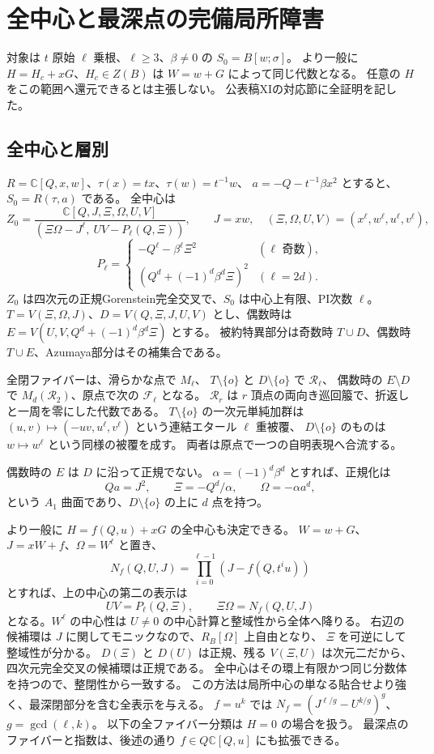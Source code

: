 \section{全中心と最深点の完備局所障害}
\label{sec:notes-global-center-v40}

対象は $t$ 原始 $\ell$ 乗根、$\ell\ge3$、$\beta\ne0$ の $S_0=B[w;\sigma]$。
より一般に $H=H_c+xG$、$H_c\in Z(B)$ は $W=w+G$ によって同じ代数となる。
任意の $H$ をこの範囲へ還元できるとは主張しない。
公表稿XIの対応節に全証明を記した。

\subsection{全中心と層別}

$R=\mathbb C[Q,x,w]$、$\tau(x)=tx$、$\tau(w)=t^{-1}w$、
$a=-Q-t^{-1}\beta x^2$ とすると、$S_0=R(\tau,a)$ である。
全中心は
\[
 Z_0=\frac{\mathbb C[Q,J,\Xi,\Omega,U,V]}
 {(\Xi\Omega-J^\ell,\ UV-P_\ell(Q,\Xi))},
 \qquad J=xw,\quad(\Xi,\Omega,U,V)=(x^\ell,w^\ell,u^\ell,v^\ell),
\]
\[
 P_\ell=
 \begin{cases}
 -Q^\ell-\beta^\ell\Xi^2& (\ell\text{ 奇数}),\\
 (Q^d+(-1)^d\beta^d\Xi)^2& (\ell=2d).
 \end{cases}
\]
$Z_0$ は四次元の正規Gorenstein完全交叉で、$S_0$ は中心上有限、PI次数 $\ell$。
$T=V(\Xi,\Omega,J)$、$D=V(Q,\Xi,J,U,V)$ とし、偶数時は
$E=V(U,V,Q^d+(-1)^d\beta^d\Xi)$ とする。
被約特異部分は奇数時 $T\cup D$、偶数時 $T\cup E$、Azumaya部分はその補集合である。

全閉ファイバーは、滑らかな点で $M_\ell$、
$T\setminus\{o\}$ と $D\setminus\{o\}$ で $\mathcal R_\ell$、
偶数時の $E\setminus D$ で $M_d(\mathcal R_2)$、原点で次の $\mathcal F_\ell$ となる。
$\mathcal R_r$ は $r$ 頂点の両向き巡回箙で、折返しと一周を零にした代数である。
$T\setminus\{o\}$ の一次元単純加群は
$(u,v)\mapsto(-uv,u^\ell,v^\ell)$ という連結エタール $\ell$ 重被覆、
$D\setminus\{o\}$ のものは $w\mapsto w^\ell$ という同様の被覆を成す。
両者は原点で一つの自明表現へ合流する。

偶数時の $E$ は $D$ に沿って正規でない。
$\alpha=(-1)^d\beta^d$ とすれば、正規化は
\[
 Qa=J^2,\qquad \Xi=-Q^d/\alpha,\qquad \Omega=-\alpha a^d,
\]
という $A_1$ 曲面であり、$D\setminus\{o\}$ の上に $d$ 点を持つ。

より一般に $H=f(Q,u)+xG$ の全中心も決定できる。
$W=w+G$、$J=xW+f$、$\Omega=W^\ell$ と置き、
\[
 N_f(Q,U,J)=\prod_{i=0}^{\ell-1}(J-f(Q,t^iu))
\]
とすれば、上の中心の第二の表示は
\[
 UV=P_\ell(Q,\Xi),\qquad \Xi\Omega=N_f(Q,U,J)
\]
となる。$W^\ell$ の中心性は $U\ne0$ の中心計算と整域性から全体へ降りる。
右辺の候補環は $J$ に関してモニックなので、$R_B[\Omega]$ 上自由となり、
$\Xi$ を可逆にして整域性が分かる。
$D(\Xi)$ と $D(U)$ は正規、残る $V(\Xi,U)$ は次元二だから、
四次元完全交叉の候補環は正規である。
全中心はその環上有限かつ同じ分数体を持つので、整閉性から一致する。
この方法は局所中心の単なる貼合せより強く、最深閉部分を含む全表示を与える。
$f=u^k$ では $N_f=(J^{\ell/g}-U^{k/g})^g$、$g=\gcd(\ell,k)$。
以下の全ファイバー分類は $H=0$ の場合を扱う。
最深点のファイバーと指数は、後述の通り $f\in Q\mathbb C[Q,u]$ にも拡張できる。

